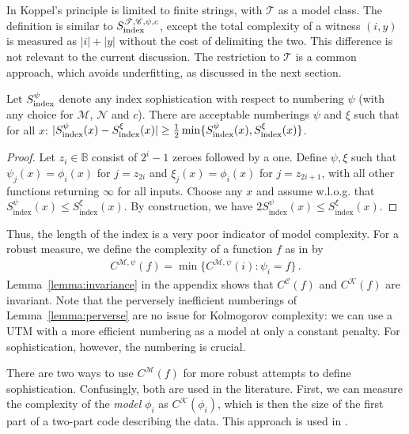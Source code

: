 \documentclass{style/llncs}
\newcommand{\M}{\mathscr M}
\newcommand{\C}{\mathscr C}
\newcommand{\T}{\mathscr T}
\newcommand{\K}{\mathscr K}
\newcommand{\B}{\mathbb B}
\newcommand{\Nm}{\mathscr N}
\newcommand{\tn}[1]{\textnormal{#1}}
\newcommand{\s}{S}
\newcommand{\p}{\,\text{.}}
\begin{document}
In \cite{antunes2009sophistication,antunes2013sophistication} Koppel's principle is limited to finite strings, with $\T$ as a model class. The definition is similar to $S_\tn{index}^{\T, \C,\psi,c}$, except the total complexity of a witness $(i,y)$ is measured as $|i|+|y|$ without the cost of delimiting the two. This difference is not relevant to the current discussion. The restriction to $\T$ is a common approach, which avoids underfitting, as discussed in the next section. 

\begin{lemma}\label{lemma:perverse}
Let $\s_\tn{index}^\psi$ denote any index sophistication with respect to numbering $\psi$ (with any choice for $\M$, $\Nm$ and $c$). There are acceptable numberings $\psi$ and $\xi$ such that for all $x$: $|\s_\tn{index}^\psi(x) - \s_\tn{index}^\xi(x)|\geq \tfrac{1}{2}\min\{\s_\tn{index}^\psi(x),\s_\tn{index}^\xi(x)\}$.
\end{lemma}
\begin{proof}
Let $z_i \in \B$ consist of $2^{i}-1$ zeroes followed by a one. Define $\psi, \xi$ such that $\psi_j(x) = \phi_i(x)$ for $j = z_{2i}$ and $\xi_j(x) = \phi_i(x)$ for $j = z_{2i+1}$, with all other functions returning $\infty$ for all inputs. Choose any $x$ and assume w.l.o.g. that $\s_\text{index}^\psi(x)\le \s_\text{index}^\xi(x)$. By construction, we have $2\s_\text{index}^\psi(x)  \leq \s_\text{index}^\xi(x)$.
\end{proof}\enlargethispage{3\baselineskip}
Thus, the length of the index is a very poor indicator of model complexity. For a robust measure, we define the complexity of a function $f$ as in \cite{grunwald2004shannon,vitanyi2004meaningful} by 
\begin{align}
C^{\M,\psi}(f) = \min\{C^{\M,\psi}(i):\psi_i=f\} \p \label{equation:function-complexity}
\end{align}
Lemma~\ref{lemma:invariance} in the appendix shows that $C^\C(f)$ and $C^\K(f)$ are invariant. Note that the perversely inefficient numberings of Lemma~\ref{lemma:perverse} are no issue for Kolmogorov complexity: we can use a UTM with a more efficient numbering as a model at only a constant penalty. For sophistication, however, the numbering is crucial.

There are two ways to use $C^\M(f)$ for more robust attempts to define sophistication. Confusingly, both are used in the literature. First, we can measure the complexity of the \emph{model} $\phi_i$ as $C^\K(\phi_i)$, which is then the size of the first part of a two-part code describing the data. This approach is used in  \cite{cover1985kolmogorov,gacs2001algorithmic,vitanyi2004meaningful,gellmann1996information}.
\end{document}
